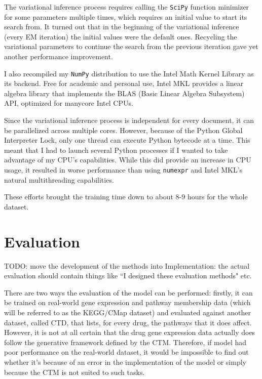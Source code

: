 \documentclass[12pt,a4paper,twoside,openright]{report}
\begin{document}
The variational inference process requires calling the \texttt{SciPy} function minimizer for some parameters multiple times, which requires an initial value to start its search from. It turned out that in the beginning of the variational inference (every EM iteration) the initial values were the default ones. Recycling the variational parameters to continue the search from the previous iteration gave yet another performance improvement.

I also recompiled my \texttt{NumPy} distribution to use the Intel Math Kernel Library as its backend. Free for academic and personal use, Intel MKL provides a linear algebra library that implements the BLAS (Basic Linear Algebra Subsystem) API, optimized for manycore Intel CPUs.

Since the variational inference process is independent for every document, it can be parallelized across multiple cores. However, because of the Python Global Interpreter Lock, only one thread can execute Python bytecode at a time. This meant that I had to launch several Python processes if I wanted to take advantage of my CPU's capabilities. While this did provide an increase in CPU usage, it resulted in worse performance than using \texttt{numexpr} and Intel MKL's natural multithreading capabilities.

These efforts brought the training time down to about 8-9 hours for the whole dataset.

\chapter{Evaluation}

TODO: move the development of the methods into Implementation: the actual evaluation should contain things like ``I designed these evaluation methods" etc.

There are two ways the evaluation of the model can be performed: firstly, it can be trained on real-world gene expression and pathway membership data (which will be referred to as the KEGG/CMap dataset) and evaluated against another dataset, called CTD, that lists, for every drug, the pathways that it does affect. However, it is not at all certain that the drug gene expression data actually does follow the generative framework defined by the CTM. Therefore, if model had poor performance on the real-world dataset, it would be impossible to find out whether it's because of an error in the implementation of the model or simply because the CTM is not suited to such tasks.
\end{document}

